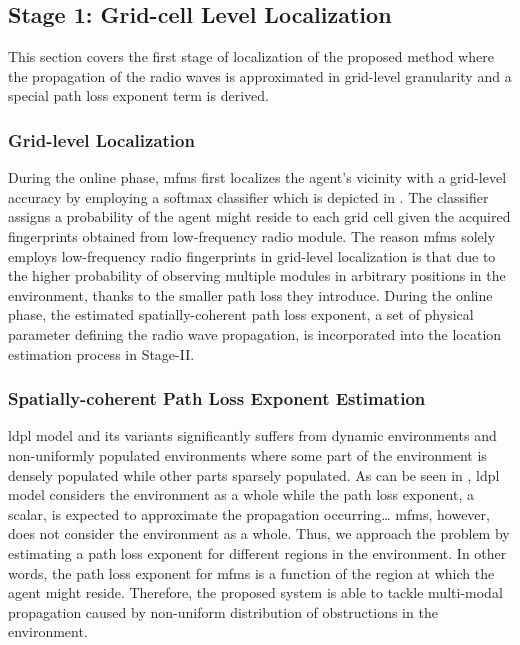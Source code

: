     \subsection{Stage 1: Grid-cell Level Localization }
    This section covers the first stage of localization of the proposed method where the propagation of the radio waves is approximated in grid-level granularity and a special path loss exponent term is derived.
      \subsubsection{Grid-level Localization}
      During the online phase, \gls{mfms} first localizes the agent's vicinity with a grid-level accuracy by employing a softmax classifier which is depicted in .
      The classifier assigns a probability of the agent might reside to each grid cell given the acquired fingerprints obtained from low-frequency radio module.
      The reason \gls{mfms} solely employs low-frequency radio fingerprints in grid-level localization is that due to the higher probability of observing multiple modules in arbitrary positions in the environment, thanks to the smaller path loss they introduce.
      During the online phase, the estimated spatially-coherent path loss exponent, a set of physical parameter defining the radio wave propagation, is incorporated into the location estimation process in Stage-II\@.


      \subsubsection{Spatially-coherent Path Loss Exponent Estimation}
        \gls{ldpl} model and its variants significantly suffers from dynamic environments and non-uniformly populated environments where some part of the environment is densely populated while other parts sparsely populated.
        As can be seen in , \gls{ldpl} model considers the environment as a whole while the path loss exponent, a scalar, is expected to approximate the propagation occurring\ldots
        \gls{mfms}, however, does not consider the environment as a whole.
        Thus, we approach the problem by estimating a path loss exponent for different regions in the environment.
        In other words, the path loss exponent for \gls{mfms} is a function of the region at which the agent might reside.
        Therefore, the proposed system is able to tackle multi-modal propagation caused by non-uniform distribution of obstructions in the environment.

